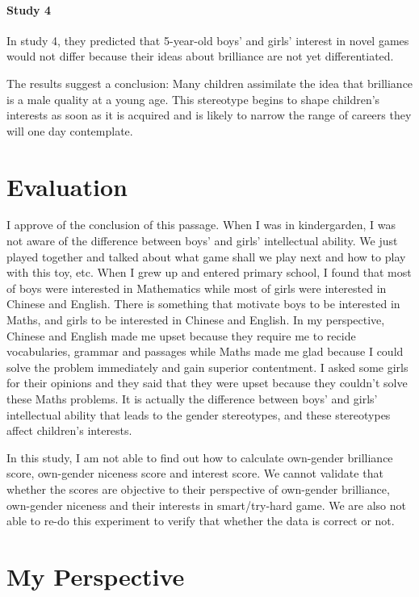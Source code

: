 \documentclass{article}
\begin{document}
\paragraph{Study 4} In study 4, they predicted that 5-year-old boys' and girls' interest in novel games would not differ because their ideas about brilliance are not yet differentiated. 

The results suggest a conclusion: Many children assimilate the idea that brilliance is a male quality at a young age. This stereotype begins to shape children's interests as soon as it is acquired and is likely to narrow the range of careers they will one day contemplate. 

\section{Evaluation}

I approve of the conclusion of this passage. When I was in kindergarden, I was not aware of the difference between boys' and girls' intellectual ability. We just played together and talked about what game shall we play next and how to play with this toy, etc. When I grew up and entered primary school, I found that most of boys were interested in Mathematics while most of girls were interested in Chinese and English. There is something that motivate boys to be interested in Maths, and girls to be interested in Chinese and English. In my perspective, Chinese and English made me upset because they require me to recide vocabularies, grammar and passages while Maths made me glad because I could solve the problem immediately and gain superior contentment. I asked some girls for their opinions and they said that they were upset because they couldn't solve these Maths problems. It is actually the difference between boys' and girls' intellectual ability that leads to the gender stereotypes, and these stereotypes affect children's interests. 

In this study, I am not able to find out how to calculate own-gender brilliance score, own-gender niceness score and interest score. We cannot validate that whether the scores are objective to their perspective of own-gender brilliance, own-gender niceness and their interests in smart/try-hard game. We are also not able to re-do this experiment to verify that whether the data is correct or not. 

\section{My Perspective}
\end{document}
